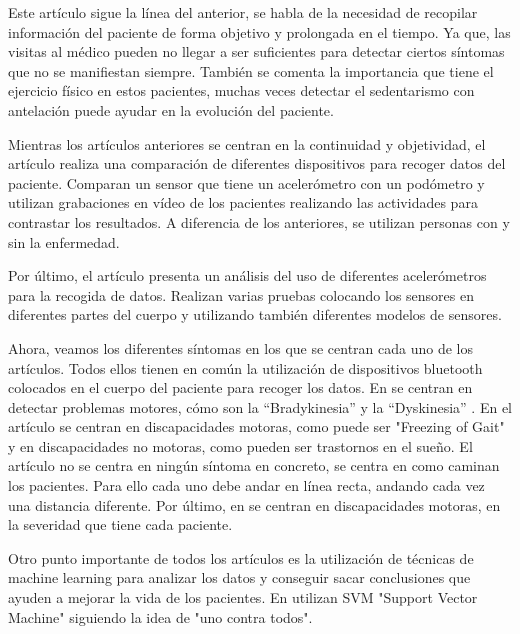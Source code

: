 \documentclass[11pt,spanish]{article}
\begin{document}
Este artículo \cite{resumen2} sigue la línea del anterior, se habla de la necesidad de recopilar información del paciente de forma objetivo y prolongada en el tiempo. Ya que, las visitas al médico pueden no llegar a ser suficientes para detectar ciertos síntomas que no se manifiestan siempre. También se comenta la importancia que tiene el ejercicio físico en estos pacientes, muchas veces detectar el sedentarismo con antelación puede ayudar en la evolución del paciente.
\newline

Mientras los artículos anteriores se centran en la continuidad y objetividad, el artículo \cite{resumen3} realiza una comparación de diferentes dispositivos para recoger datos del paciente. Comparan un sensor que tiene un acelerómetro con un podómetro y utilizan grabaciones en vídeo de los pacientes realizando las actividades para contrastar los resultados. A diferencia de los anteriores, se utilizan personas con y sin la enfermedad.
\newline

Por último, el artículo \cite{resumen4} presenta un análisis del uso de diferentes acelerómetros para la recogida de datos. Realizan varias pruebas colocando los sensores en diferentes partes del cuerpo y utilizando también diferentes modelos de sensores.
\newline

Ahora, veamos los diferentes síntomas en los que se centran cada uno de los artículos. Todos ellos tienen en común la utilización de dispositivos bluetooth colocados en el cuerpo del paciente para recoger los datos. En \cite{resumen1} se centran en detectar problemas motores, cómo son la “Bradykinesia” \cite{Hipocinesia} y la “Dyskinesia” \cite{Dyskinesia}. En el artículo \cite{resumen2} se centran en discapacidades motoras, como puede ser "Freezing of Gait" \cite{Gait} y en discapacidades no motoras, como pueden ser trastornos en el sueño. El artículo \cite{resumen3} no se centra en ningún síntoma en concreto, se centra en como caminan los pacientes. Para ello cada uno debe andar en línea recta, andando cada vez una distancia diferente. Por último, en \cite{resumen4} se centran en discapacidades motoras, en la severidad que tiene cada paciente.
\newline

Otro punto importante de todos los artículos es la utilización de técnicas de machine learning para analizar los datos y conseguir sacar conclusiones que ayuden a mejorar la vida de los pacientes. En \cite{resumen4} utilizan SVM "Support Vector Machine" \cite{SVM} siguiendo la idea de "uno contra todos".
\newline
\end{document}
